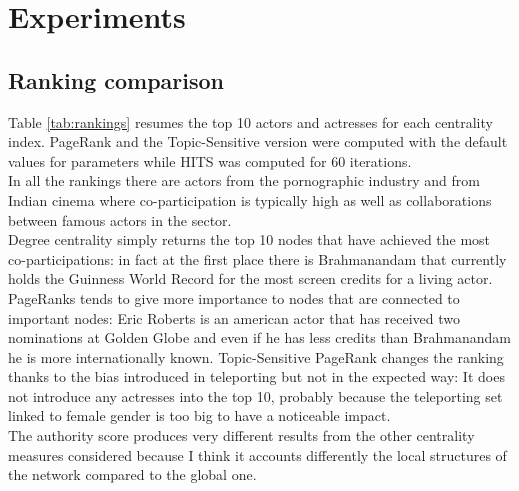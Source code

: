 \documentclass{article}
\begin{document}
\section{Experiments}
\label{sec:experiments}
\subsection{Ranking comparison}
Table \ref{tab:rankings} resumes the top 10 actors and actresses for each centrality index. PageRank and the Topic-Sensitive version were computed with the default values for parameters while HITS was computed for 60 iterations. \\In all the rankings there are actors from the pornographic industry and from Indian cinema where co-participation is typically high as well as collaborations between famous actors in the sector. \\ Degree centrality simply returns the top 10 nodes that have achieved the most co-participations: in fact at the first place there is Brahmanandam that currently holds the Guinness World Record for the most screen credits for a living actor. \\ PageRanks tends to give more importance to nodes that are connected to important nodes: Eric Roberts is an american actor that has received two nominations at Golden Globe and even if he has less credits than Brahmanandam he is more internationally known. Topic-Sensitive PageRank changes the ranking thanks to the bias introduced in teleporting but not in the expected way: It does not introduce any actresses into the top 10, probably because the teleporting set linked to female gender is too big to have a noticeable impact. \\ The authority score produces very different results from the other centrality measures considered because I think it accounts differently the local structures of the network compared to the global one.
\end{document}
